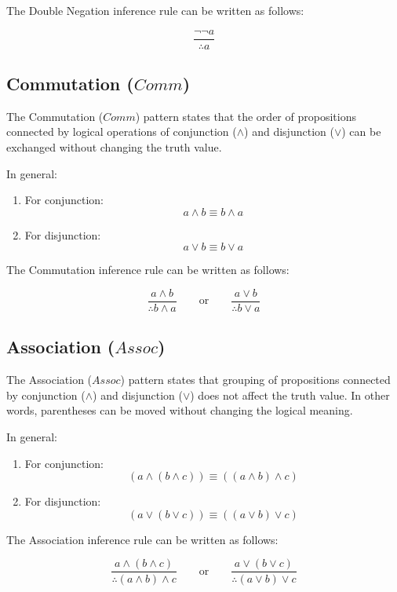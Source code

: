 \documentclass[12pt,a4paper,openany]{article}
\begin{document}
The Double Negation inference rule can be written as follows:

\[
\frac{\lnot \lnot a}{\therefore a}
\]

\subsection{Commutation (\(Comm\))}\label{commutation-comm}

The Commutation (\(Comm\)) pattern states that the order of propositions connected by logical operations of conjunction (\(\land\)) and disjunction (\(\lor\)) can be exchanged without changing the truth value.

In general:

\begin{enumerate}
\item For conjunction:
  \[a \land b \equiv b \land a\]
\item For disjunction:
  \[a \lor b \equiv b \lor a\]
\end{enumerate}

The Commutation inference rule can be written as follows:

\[
\frac{a \land b}{\therefore b \land a}
\qquad \text{or} \qquad
\frac{a \lor b}{\therefore b \lor a}
\]

\subsection{Association (\(Assoc\))}\label{association-assoc}

The Association (\(Assoc\)) pattern states that grouping of propositions connected by conjunction (\(\land\)) and disjunction (\(\lor\)) does not affect the truth value. In other words, parentheses can be moved without changing the logical meaning.

In general:

\begin{enumerate}
\item For conjunction:
  \[(a \land (b \land c)) \equiv ((a \land b) \land c)\]
\item For disjunction:
  \[(a \lor (b \lor c)) \equiv ((a \lor b) \lor c)\]
\end{enumerate}

The Association inference rule can be written as follows:

\[
\frac{a \land (b \land c)}{\therefore (a \land b) \land c}
\qquad \text{or} \qquad
\frac{a \lor (b \lor c)}{\therefore (a \lor b) \lor c}
\]
\end{document}
